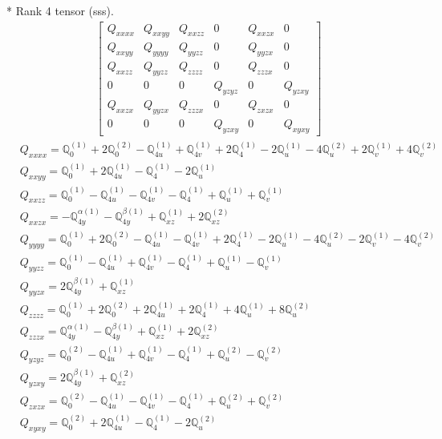\documentclass[fleqn,8pt,landscape]{jsarticle}
\begin{document}
* Rank 4 tensor (sss).
\begin{align*}
\begin{bmatrix} Q_{xxxx} & Q_{xxyy} & Q_{xxzz} & 0 & Q_{xxzx} & 0 \\ Q_{xxyy} & Q_{yyyy} & Q_{yyzz} & 0 & Q_{yyzx} & 0 \\ Q_{xxzz} & Q_{yyzz} & Q_{zzzz} & 0 & Q_{zzzx} & 0 \\ 0 & 0 & 0 & Q_{yzyz} & 0 & Q_{yzxy} \\ Q_{xxzx} & Q_{yyzx} & Q_{zzzx} & 0 & Q_{zxzx} & 0 \\ 0 & 0 & 0 & Q_{yzxy} & 0 & Q_{xyxy} \end{bmatrix}
\end{align*}
\begin{align*}
& Q_{xxxx} = \mathbb{Q}_{0}^{(1)} + 2 \mathbb{Q}_{0}^{(2)} - \mathbb{Q}_{4u}^{(1)} + \mathbb{Q}_{4v}^{(1)} + 2 \mathbb{Q}_{4}^{(1)} - 2 \mathbb{Q}_{u}^{(1)} - 4 \mathbb{Q}_{u}^{(2)} + 2 \mathbb{Q}_{v}^{(1)} + 4 \mathbb{Q}_{v}^{(2)} \\
& Q_{xxyy} = \mathbb{Q}_{0}^{(1)} + 2 \mathbb{Q}_{4u}^{(1)} - \mathbb{Q}_{4}^{(1)} - 2 \mathbb{Q}_{u}^{(1)} \\
& Q_{xxzz} = \mathbb{Q}_{0}^{(1)} - \mathbb{Q}_{4u}^{(1)} - \mathbb{Q}_{4v}^{(1)} - \mathbb{Q}_{4}^{(1)} + \mathbb{Q}_{u}^{(1)} + \mathbb{Q}_{v}^{(1)} \\
& Q_{xxzx} = - \mathbb{Q}_{4y}^{\alpha(1)} - \mathbb{Q}_{4y}^{\beta(1)} + \mathbb{Q}_{xz}^{(1)} + 2 \mathbb{Q}_{xz}^{(2)} \\
& Q_{yyyy} = \mathbb{Q}_{0}^{(1)} + 2 \mathbb{Q}_{0}^{(2)} - \mathbb{Q}_{4u}^{(1)} - \mathbb{Q}_{4v}^{(1)} + 2 \mathbb{Q}_{4}^{(1)} - 2 \mathbb{Q}_{u}^{(1)} - 4 \mathbb{Q}_{u}^{(2)} - 2 \mathbb{Q}_{v}^{(1)} - 4 \mathbb{Q}_{v}^{(2)} \\
& Q_{yyzz} = \mathbb{Q}_{0}^{(1)} - \mathbb{Q}_{4u}^{(1)} + \mathbb{Q}_{4v}^{(1)} - \mathbb{Q}_{4}^{(1)} + \mathbb{Q}_{u}^{(1)} - \mathbb{Q}_{v}^{(1)} \\
& Q_{yyzx} = 2 \mathbb{Q}_{4y}^{\beta(1)} + \mathbb{Q}_{xz}^{(1)} \\
& Q_{zzzz} = \mathbb{Q}_{0}^{(1)} + 2 \mathbb{Q}_{0}^{(2)} + 2 \mathbb{Q}_{4u}^{(1)} + 2 \mathbb{Q}_{4}^{(1)} + 4 \mathbb{Q}_{u}^{(1)} + 8 \mathbb{Q}_{u}^{(2)} \\
& Q_{zzzx} = \mathbb{Q}_{4y}^{\alpha(1)} - \mathbb{Q}_{4y}^{\beta(1)} + \mathbb{Q}_{xz}^{(1)} + 2 \mathbb{Q}_{xz}^{(2)} \\
& Q_{yzyz} = \mathbb{Q}_{0}^{(2)} - \mathbb{Q}_{4u}^{(1)} + \mathbb{Q}_{4v}^{(1)} - \mathbb{Q}_{4}^{(1)} + \mathbb{Q}_{u}^{(2)} - \mathbb{Q}_{v}^{(2)} \\
& Q_{yzxy} = 2 \mathbb{Q}_{4y}^{\beta(1)} + \mathbb{Q}_{xz}^{(2)} \\
& Q_{zxzx} = \mathbb{Q}_{0}^{(2)} - \mathbb{Q}_{4u}^{(1)} - \mathbb{Q}_{4v}^{(1)} - \mathbb{Q}_{4}^{(1)} + \mathbb{Q}_{u}^{(2)} + \mathbb{Q}_{v}^{(2)} \\
& Q_{xyxy} = \mathbb{Q}_{0}^{(2)} + 2 \mathbb{Q}_{4u}^{(1)} - \mathbb{Q}_{4}^{(1)} - 2 \mathbb{Q}_{u}^{(2)}
\end{align*}
\end{document}
